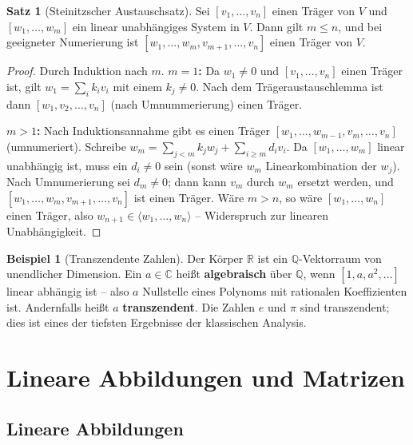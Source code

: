﻿\documentclass[a4paper,12pt]{report}
\theoremstyle{definition}
\newtheorem{beispiel}{Beispiel}
\newtheorem{satz}{Satz}
\begin{document}
\begin{satz}[Steinitzscher Austauschsatz]
    Sei $[v_1, \dots, v_n]$ einen Träger von $V$ und $[w_1, \dots, w_m]$ ein
    linear unabhängiges System in $V$. Dann gilt $m \le n$, und bei geeigneter
    Numerierung ist $[w_1, \dots, w_m, v_{m+1}, \dots, v_n]$ einen Träger von $V$.
\end{satz}
\begin{proof}
    Durch Induktion nach $m$. \textbf{$m = 1$:} Da $w_1 \neq 0$ und $[v_1, \ldots, v_n]$
    einen Träger ist, gilt $w_1 = \sum_i k_i v_i$ mit einem $k_j \neq 0$.
    Nach dem Trägeraustauschlemma ist dann $[w_1, v_2, \ldots, v_n]$ (nach Umnummerierung)
    einen Träger.

    \textbf{$m > 1$:} Nach Induktionsannahme gibt es einen Träger
    $[w_1, \ldots, w_{m-1}, v_m, \ldots, v_n]$ (umnumeriert). Schreibe
    $w_m = \sum_{j<m} k_j w_j + \sum_{i \geq m} d_i v_i$.
    Da $[w_1, \ldots, w_m]$ linear unabhängig ist, muss ein $d_i \neq 0$ sein
    (sonst wäre $w_m$ Linearkombination der $w_j$). Nach Umnumerierung sei
    $d_m \neq 0$; dann kann $v_m$ durch $w_m$ ersetzt werden, und
    $[w_1, \ldots, w_m, v_{m+1}, \ldots, v_n]$ ist einen Träger.
    Wäre $m > n$, so wäre $[w_1, \ldots, w_n]$ einen Träger, also $w_{n+1}
    \in \langle w_1, \ldots, w_n \rangle$ -- Widerspruch zur linearen Unabhängigkeit.
\end{proof}


\begin{beispiel}[Transzendente Zahlen]
    Der Körper $\mathbb{R}$ ist ein $\mathbb{Q}$-Vektorraum von unendlicher
    Dimension. Ein $a \in \mathbb{C}$ heißt \textbf{algebraisch} über $\mathbb{Q}$,
    wenn $[1, a, a^2, \dots]$ linear abhängig ist -- also $a$ Nullstelle eines
    Polynoms mit rationalen Koeffizienten ist. Andernfalls heißt $a$
    \textbf{transzendent}. Die Zahlen $e$ und $\pi$ sind transzendent;
    dies ist eines der tiefsten Ergebnisse der klassischen Analysis.
\end{beispiel}

\chapter{Lineare Abbildungen und Matrizen}

\section{Lineare Abbildungen}
\end{document}
